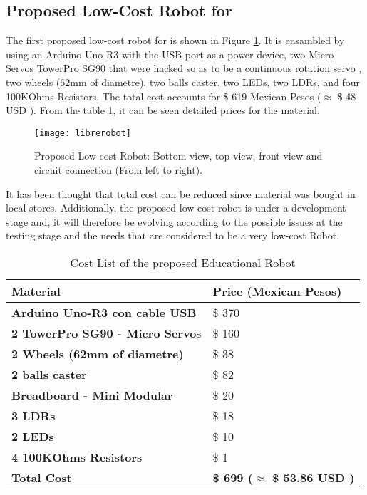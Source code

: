 \subsection{Proposed Low-Cost Robot for {\librER}}

The first proposed low-cost robot for {\librER} is shown in Figure \ref{fig:librerobot}.
It is ensambled by using an Arduino Uno-R3 with the USB port as a power device, two Micro 
Servos TowerPro SG90 that were hacked so as to be a continuous rotation servo 
\cite{servohack1, servohack2}, two wheels (62mm of diametre), two balls caster, two LEDs, 
two LDRs, and four 100KOhms Resistors. The total cost accounts for \$  619 Mexican Pesos 
($\approx$ \$ 48 USD ). From the table \ref{t:lcr}, it can be seen detailed prices for 
the material. 
\begin{figure}[htbp!] 
\centering    
\texttt{[image: librerobot]}
\caption[PA]{Proposed Low-cost Robot: Bottom view, top view, front view and
circuit connection (From left to right).}
\label{fig:librerobot}
\end{figure}
It has been thought that total cost can be reduced since material was bought in local 
stores. Additionally, the proposed low-cost robot is under a development stage and, 
it will therefore be evolving according to the possible issues at the testing stage and 
the needs that are considered to be a very low-cost Robot.
 \begin{table}[h]
 \centering
\begin{tabular}
 { l | l }
 \toprule
 
 \textbf{Material} & Price (Mexican Pesos) \\ 
 \midrule
  
 \textbf{Arduino Uno-R3 con cable USB} & \$ 370 \\
 \textbf{2 TowerPro SG90 - Micro Servos} & \$ 160 \\
 \textbf{2 Wheels (62mm of diametre)} &  \$ 38 \\
 \textbf{2 balls caster } & \$ 82 \\
 \textbf{Breadboard - Mini Modular} &  \$ 20 \\
 \textbf{3 LDRs } & \$ 18 \\
 \textbf{2 LEDs } & \$ 10 \\
 \textbf{4 100KOhms Resistors } & \$ 1 \\
 \textbf{Total Cost} & \textbf{\$  699 ($\approx$ \$ 53.86 USD )} \\
 \bottomrule
 \end{tabular}
 \caption{Cost List of the proposed Educational Robot}
\label{t:lcr}
\end{table}
 
